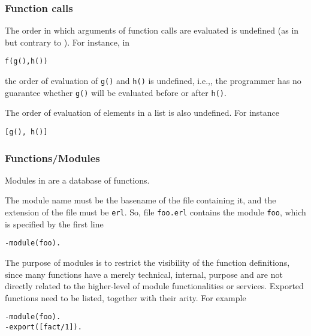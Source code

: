 
%
\begin{frame}[containsverbatim]
\frametitle{Function calls}

The order in which arguments of function calls are evaluated is
undefined (as in \cpp{} but contrary to \Java). For instance, in
\begin{verbatim}
f(g(),h())
\end{verbatim}
the order of evaluation of \texttt{g()} and \texttt{h()} is undefined,
i.e.,, the programmer has no guarantee whether \texttt{g()} will be
evaluated before or after \texttt{h()}.

\bigskip

The order of evaluation of elements in a list is also undefined. For
instance
\begin{verbatim}
[g(), h()]
\end{verbatim}

\end{frame}

%
\begin{frame}[containsverbatim]
\frametitle{Functions/Modules}

Modules in \Erlang are a database of functions.

\bigskip

The module name must be the basename of the file containing it, and
the extension of the file must be \texttt{erl}. So, file
\texttt{foo.erl} contains the \Erlang module \texttt{foo}, which is
specified by the first line
\begin{verbatim}
-module(foo).
\end{verbatim}
The purpose of \Erlang modules is to restrict the visibility of the
function definitions, since many functions have a merely technical,
internal, purpose and are not directly related to the higher-level of
module functionalities or services. Exported functions need to be
listed, together with their arity. For example
\begin{verbatim}
-module(foo).
-export([fact/1]).
\end{verbatim}

\end{frame}

